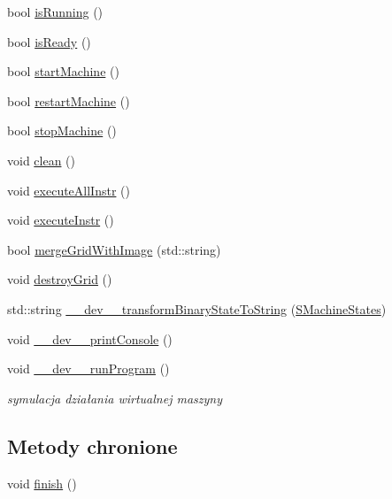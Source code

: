 \begin{CompactItemize}
\item 
bool \hyperlink{classSVirtualMachine_09f1f983396791f84947f80097351862}{isRunning} ()
\item 
bool \hyperlink{classSVirtualMachine_86dfbb99cbccd36729253cf34835c805}{isReady} ()
\item 
bool \hyperlink{classSVirtualMachine_49e93dd25b48a8dbba896f9b2964c526}{startMachine} ()
\item 
bool \hyperlink{classSVirtualMachine_5be1048d2d6f330994a10032d9609277}{restartMachine} ()
\item 
bool \hyperlink{classSVirtualMachine_81211b6ef712dbc4a147d7fa86aed440}{stopMachine} ()
\item 
void \hyperlink{classSVirtualMachine_85f2b4a688a077283010a11145289110}{clean} ()
\item 
void \hyperlink{classSVirtualMachine_f3874f10dac15f27b23dc4b976271413}{executeAllInstr} ()
\item 
void \hyperlink{classSVirtualMachine_200c4aae4eedf52ba7a3754295505186}{executeInstr} ()
\item 
bool \hyperlink{classSVirtualMachine_0257c841ecfbb17f2c85ffd2d8764de8}{mergeGridWithImage} (std::string)
\item 
void \hyperlink{classSVirtualMachine_74f8812f8711a172f9ad3a3f92446af7}{destroyGrid} ()
\item 
std::string \hyperlink{classSVirtualMachine_f8e1ef67bff80a4ce0aa7afc741a1a93}{\_\-\_\-dev\_\-\_\-transformBinaryStateToString} (\hyperlink{senums_8h_c31b206c0c7cd52b9a0b18204f373c7e}{SMachineStates})
\item 
void \hyperlink{classSVirtualMachine_21b1ac24c7018fd084a553a66f5827ea}{\_\-\_\-dev\_\-\_\-printConsole} ()
\item 
void \hyperlink{classSVirtualMachine_d07f353daaf626f5efeb8bd34818db75}{\_\-\_\-dev\_\-\_\-runProgram} ()
\begin{CompactList}\small\item\em symulacja działania wirtualnej maszyny \item\end{CompactList}\end{CompactItemize}
\subsection*{Metody chronione}
\begin{CompactItemize}
\item 
void \hyperlink{classSVirtualMachine_5eb2195ecac5f0bed11b2318cf8feed2}{finish} ()
\end{CompactItemize}


